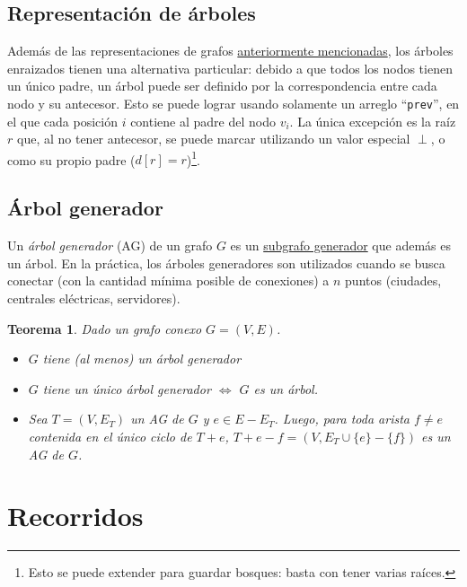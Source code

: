\documentclass[a4paper]{report}
\newcommand{\code}{\texttt}
\newtheorem*{theorem*}{Teorema}
\begin{document}

\subsection{Representación de árboles}

Además de las representaciones de grafos \hyperref[representacion-grafos]{anteriormente mencionadas}, los árboles enraizados tienen una alternativa particular: debido a que todos los nodos tienen un único padre, un árbol puede ser definido por la correspondencia entre cada nodo y su antecesor. Esto se puede lograr usando solamente un arreglo ``\code{prev}'', en el que cada posición $i$ contiene al padre del nodo $v_i$. La única excepción es la raíz $r$ que, al no tener antecesor, se puede marcar utilizando un valor especial $\perp$, o como su propio padre ($d[r] = r$)\footnote{Esto se puede extender para guardar bosques: basta con tener varias raíces.}.

\subsection{Árbol generador}
\label{arbol-generador}

Un \textit{árbol generador} (AG) de un grafo $G$ es un \hyperref[subgrafos]{subgrafo generador} que además es un árbol. En la práctica, los árboles generadores son utilizados cuando se busca conectar (con la cantidad mínima posible de conexiones) a $n$ puntos (ciudades, centrales eléctricas, servidores).
\begin{theorem*}
    Dado un grafo conexo $G = (V, E)$.

    \begin{itemize}
        \item $G$ tiene (al menos) un árbol generador
        \item $G$ tiene un único árbol generador $\iff$ $G$ es un árbol.
        \item Sea $T = (V, E_T)$ un AG de $G$ y $e \in E - E_T$. Luego, para toda arista $f \neq e$ contenida en el único ciclo de $T + e$, $T + e - f = (V, E_T \cup \{e\} - \{f\})$ es un AG de $G$.
    \end{itemize}
\end{theorem*}

\section{Recorridos}
\label{recorridos}
\end{document}
